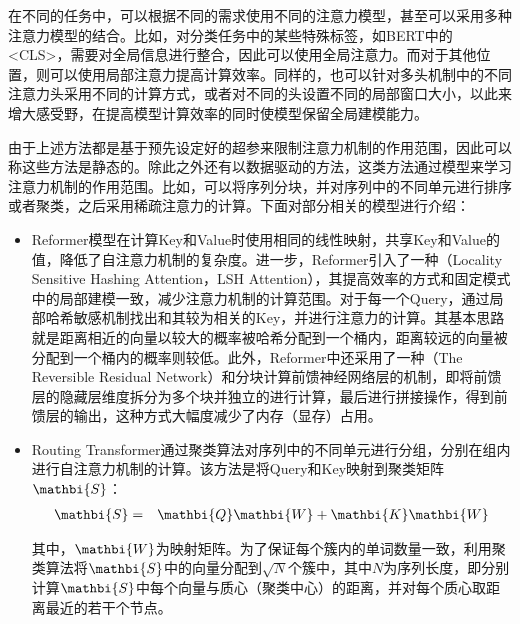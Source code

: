 \parinterval 在不同的任务中，可以根据不同的需求使用不同的注意力模型，甚至可以采用多种注意力模型的结合。比如，对分类任务中的某些特殊标签，如BERT中的<CLS>，需要对全局信息进行整合，因此可以使用全局注意力。而对于其他位置，则可以使用局部注意力提高计算效率。同样的，也可以针对多头机制中的不同注意力头采用不同的计算方式，或者对不同的头设置不同的局部窗口大小，以此来增大感受野，在提高模型计算效率的同时使模型保留全局建模能力。

\parinterval 由于上述方法都是基于预先设定好的超参来限制注意力机制的作用范围，因此可以称这些方法是静态的。除此之外还有以数据驱动的方法，这类方法通过模型来学习注意力机制的作用范围。比如，可以将序列分块，并对序列中的不同单元进行排序或者聚类，之后采用稀疏注意力的计算。下面对部分相关的模型进行介绍：

\begin{itemize}
\vspace{0.5em}
\item Reformer模型在计算Key和Value时使用相同的线性映射，共享Key和Value的值，降低了自注意力机制的复杂度。进一步，Reformer引入了一种{\small{}}（Locality Sensitive Hashing Attention，LSH Attention），其提高效率的方式和固定模式中的局部建模一致，减少注意力机制的计算范围。对于每一个Query，通过局部哈希敏感机制找出和其较为相关的Key，并进行注意力的计算。其基本思路就是距离相近的向量以较大的概率被哈希分配到一个桶内，距离较远的向量被分配到一个桶内的概率则较低。此外，Reformer中还采用了一种{\small{}}（The Reversible Residual Network）和分块计算前馈神经网络层的机制，即将前馈层的隐藏层维度拆分为多个块并独立的进行计算，最后进行拼接操作，得到前馈层的输出，这种方式大幅度减少了内存（显存）占用。

\vspace{0.5em}
\item Routing Transformer通过聚类算法对序列中的不同单元进行分组，分别在组内进行自注意力机制的计算。该方法是将Query和Key映射到聚类矩阵$\mathbi{S}$：
\begin{eqnarray}
\mathbi{S} &=& \mathbi{Q} \mathbi{W} + \mathbi{K} \mathbi{W}
\label{eq:15-24}
\end{eqnarray}

\noindent 其中，$\mathbi{W}$为映射矩阵。为了保证每个簇内的单词数量一致，利用聚类算法将$\mathbi{S}$中的向量分配到$\sqrt{N}$个簇中，其中$N$为序列长度，即分别计算$\mathbi{S}$中每个向量与质心（聚类中心）的距离，并对每个质心取距离最近的若干个节点。

\vspace{0.5em}
\end{itemize}

